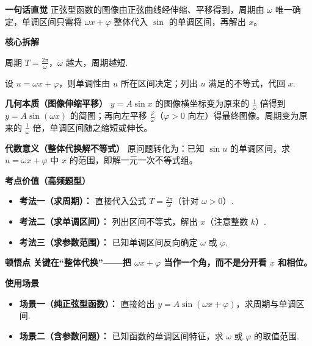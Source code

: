 \begin{explanationbox}
	\textbf{\textcolor{CExplanation}{一句话直觉}}
	正弦型函数的图像由正弦曲线经伸缩、平移得到，周期由 $\omega$ 唯一确定，单调区间只需将 $\omega x+\varphi$ 整体代入 $\sin$ 的单调区间，再解出 $x$。

	\medskip
	\textbf{\textcolor{CExplanation}{核心拆解}}
	\begin{description}[style=nextline, leftmargin=2.8em, labelsep=0.5em, itemsep=0.45em]
		\item[\textbf{要点一（周期与 $\omega$）：}]
			周期 $T = \frac{2\pi}{\omega}$，$\omega$ 越大，周期越短.
		\item[\textbf{要点二（整体代换法）：}]
			设 $u = \omega x + \varphi$，则单调性由 $u$ 所在区间决定；列出 $u$ 满足的不等式，代回 $x$.
	\end{description}

	\medskip
	\textbf{\textcolor{CExplanation}{几何本质（图像伸缩平移）}}
	$y=A\sin x$ 的图像横坐标变为原来的 $\frac{1}{\omega}$ 倍得到 $y=A\sin(\omega x)$ 的简图；再向左平移 $\frac{\varphi}{\omega}$（$\varphi > 0$ 向左）得最终图像。周期变为原来的 $\frac{1}{\omega}$ 倍，单调区间随之缩短或伸长。

	\medskip
	\textbf{\textcolor{CExplanation}{代数意义（整体代换解不等式）}}
	原问题转化为：已知 $\sin u$ 的单调区间，求 $u = \omega x + \varphi$ 中 $x$ 的范围，即解一元一次不等式组。

	\medskip
	\textbf{\textcolor{CExplanation}{考点价值（高频题型）}}
	\begin{itemize}[leftmargin=*, itemsep=0.5em, topsep=0.4em]
		\item \textbf{考法一（求周期）：} 直接代入公式 $T = \frac{2\pi}{\omega}$（针对 $\omega>0$）.
		\item \textbf{考法二（求单调区间）：} 列出区间不等式，解出 $x$（注意整数 $k$）.
		\item \textbf{考法三（求参数范围）：} 已知单调区间反向确定 $\omega$ 或 $\varphi$.
	\end{itemize}

	\medskip
	\textbf{\textcolor{CExplanation}{顿悟点}}
	\textbf{关键在“整体代换”——把 $\omega x+\varphi$ 当作一个角，而不是分开看 $x$ 和相位。}

	\medskip
	\textbf{\textcolor{CExplanation}{使用场景}}
	\begin{itemize}[leftmargin=*, itemsep=0.5em, topsep=0.4em]
		\item \textbf{场景一（纯正弦型函数）：} 直接给出 $y = A\sin(\omega x + \varphi)$，求周期与单调区间.
		\item \textbf{场景二（含参数问题）：} 已知函数的单调区间特征，求 $\omega$ 或 $\varphi$ 的取值范围.
	\end{itemize}

\end{explanationbox}

